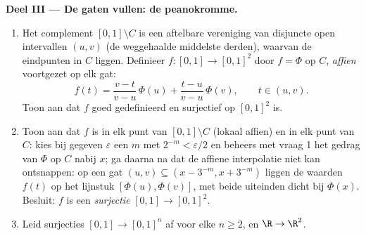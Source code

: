\begin{problem}
\medskip
\noindent\textbf{Deel III --- De gaten vullen: de peanokromme.}
\begin{enumerate}[resume]
  \item Het complement $[0,1] \setminus C$ is een aftelbare
        vereniging van disjuncte open intervallen $(u, v)$ (de
        weggehaalde middelste derden), waarvan de eindpunten in
        $C$ liggen. Definieer $f \colon [0,1] \to [0,1]^2$ door $f
        = \Phi$ op $C$, \emph{affien} voortgezet op elk gat:
        \[
        f(t) = \frac{v - t}{v - u}\,\Phi(u) +
        \frac{t - u}{v - u}\,\Phi(v),
        \qquad t \in (u, v).
        \]
        Toon aan dat $f$ goed gedefinieerd en surjectief op
        $[0,1]^2$ is.
  \item Toon aan dat $f$  is in elk punt van $[0,1]
        \setminus C$ (lokaal affien) en in elk punt van $C$: kies
        bij gegeven $\varepsilon$ een $m$ met $2^{-m} <
        \varepsilon/2$ en beheers met vraag 1 het gedrag van
        $\Phi$ op $C$ nabij $x$; ga daarna na dat de affiene
        interpolatie niet kan ontsnappen: op een gat $(u,v)
        \subseteq (x - 3^{-m}, x + 3^{-m})$ liggen de waarden
        $f(t)$ op het lijnstuk $[\Phi(u), \Phi(v)]$, met beide
        uiteinden dicht bij $\Phi(x)$. Besluit: $f$ is een
        \emph{ surjectie} $[0,1] \to [0,1]^2$.
  \item Leid  surjecties $[0,1] \to [0,1]^n$ af voor elke
        $n \geq 2$, en $\R \to \R^2$.
\end{enumerate}


\end{problem}
